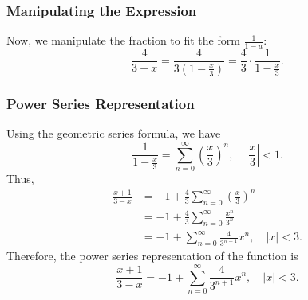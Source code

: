 \subsubsection{Manipulating the Expression}
Now, we manipulate the fraction to fit the form \(\frac{1}{1 - u}\):
\[
\frac{4}{3 - x} = \frac{4}{3(1 - \frac{x}{3})} = \frac{4}{3} \cdot \frac{1}{1 - \frac{x}{3}}.
\]

\subsubsection{Power Series Representation}
Using the geometric series formula, we have
\[
\frac{1}{1 - \frac{x}{3}} = \sum_{n=0}^{\infty} \left( \frac{x}{3} \right)^n, \quad \left| \frac{x}{3} \right| < 1.
\]
Thus,
\begin{align*}
\frac{x + 1}{3 - x} &= -1 + \frac{4}{3} \sum_{n=0}^{\infty} \left( \frac{x}{3} \right)^n \\
&= -1 + \frac{4}{3} \sum_{n=0}^{\infty} \frac{x^n}{3^n} \\
&= -1 + \sum_{n=0}^{\infty} \frac{4}{3^{n+1}} x^n, \quad |x| < 3.
\end{align*}
Therefore, the power series representation of the function is
\[
\frac{x + 1}{3 - x} = -1 + \sum_{n=0}^{\infty} \frac{4}{3^{n+1}} x^n, \quad |x| < 3.
\]

\newpage